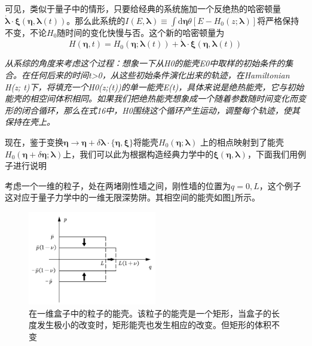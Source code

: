可见，类似于量子中的情形，只要给经典的系统施加一个反绝热的哈密顿量$\dot{\boldsymbol{\lambda}} \cdot \boldsymbol{\xi}(\bm{\eta}, \boldsymbol{\lambda}(t))$。那么此系统的$I(E, \boldsymbol{\lambda}) \equiv \int \mathrm{d} \bm{\eta} \theta\left[E-H_{0}(z ; \boldsymbol{\lambda})\right]$将严格保持不变，不论$H_0 $随时间的变化快慢与否。这个新的哈密顿量为
\begin{equation}
    H(\bm{\eta}, t)=H_{0}(\bm{\eta} ; \boldsymbol{\lambda}(t))+\dot{\boldsymbol{\lambda}} \cdot \boldsymbol{\xi}(\bm{\eta}, \boldsymbol{\lambda}(t))
    \label{eq2.17}
\end{equation}

\emph{从系综的角度来考虑这个过程：想象一下从H0的能壳E0中取样的初始条件的集合。在任何后来的时间t>0，从这些初始条件演化出来的轨迹，在Hamiltonian H(z; t)下，将填充一个H0(z;(t))的单一能壳E(t)，具体来说是绝热能壳，它与初始能壳的相空间体积相同。如果我们把绝热能壳想象成一个随着参数随时间变化而变形的闭合循环，那么在式16中，H0围绕这个循环产生运动，调整每个轨迹，使其保持在壳上。}

现在，鉴于变换$\bm{\eta} \to \bm{\eta} + \delta  \bm{\lambda} \cdot \{\bm{\eta}, \boldsymbol{\xi}\}$将能壳$H_{0}(\bm{\eta} ; \boldsymbol{\lambda})$ 上的相点映射到了能壳 $ H_{0}(\bm{\eta} + \delta \bm{\eta} ; \boldsymbol{\lambda})$上，我们可以此为根据构造经典力学中的$\boldsymbol{\xi}(\bm{\eta}, \boldsymbol{\lambda})$，下面我们用例子进行说明

考虑一个一维的粒子，处在两堵刚性墙之间，刚性墙的位置为$q=0,L$，这个例子这对应于量子力学中的一维无限深势阱。其相空间的能壳如图\ref{p2.1}所示。
\begin{figure}[!htbp]
    \begin{center}
        \includegraphics[width=0.5\textwidth]{figures/p2.1.pdf}
    \end{center}
    \caption{在一维盒子中的粒子的能壳。该粒子的能壳是一个矩形，当盒子的长度发生极小的改变时，矩形能壳也发生相应的改变。但矩形的体积不变}
    \label{p2.1}
\end{figure}

